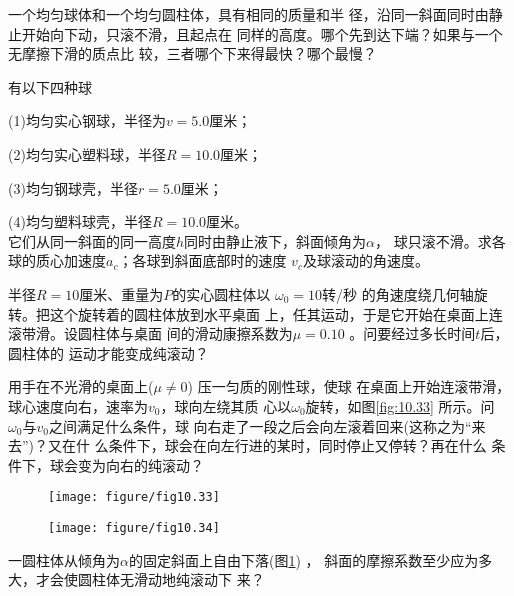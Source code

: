 \documentclass[../outline-of-mechanics.tex]{subfiles}
\begin{document}
\begin{exercises}
\exercise 一个均匀球体和一个均匀圆柱体，具有相同的质量和半
径，沿同一斜面同时由静止开始向下动，只滚不滑，且起点在
同样的高度。哪个先到达下端？如果与一个无摩擦下滑的质点比
较，三者哪个下来得最快？哪个最慢？

\exercise 有以下四种球

(1)均匀实心钢球，半径为$ v = 5 . 0 $厘米；

(2)均匀实心塑料球，半径$ R = 1 0 . 0 $厘米；

(3)均匀钢球壳，半径$ r = 5 . 0 $厘米；

(4)均匀塑料球壳，半径$ R = 1 0 . 0 $厘米。\\
它们从同一斜面的同一高度$ h $同时由静止液下，斜面倾角为$ \alpha $，
球只滚不滑。求各球的质心加速度$ a _ { c } $；各球到斜面底部时的速度
$ v _ { c } $及球滚动的角速度。

\exercise 半径$ R = 1 0 $厘米、重量为$ P $的实心圆柱体以 $ \omega _ { 0 } = 1 0 $转/秒
的角速度绕几何轴旋转。把这个旋转着的圆柱体放到水平桌面
上，任其运动，于是它开始在桌面上连滚带滑。设圆柱体与桌面
间的滑动康擦系数为$ \mu = 0 . 1 0 $ 。问要经过多长时间$ t $后，圆柱体的
运动才能变成纯滚动？

\exercise 用手在不光滑的桌面上($ \mu \ne 0 $) 压一匀质的刚性球，使球
在桌面上开始连滚带滑，球心速度向右，速率为$ v _ { 0 } $，球向左绕其质
心以$ \omega _ { 0 } $旋转，如图\ref{fig:10.33} 所示。问 $ \omega _ { 0 } $与$ v _ { 0 } $之间满足什么条件，球
向右走了一段之后会向左滚着回来(这称之为“来去”)？又在什
么条件下，球会在向左行进的某时，同时停止又停转？再在什么
条件下，球会变为向右的纯滚动？

\begin{figure}[h]
  \begin{minipage}{0.4\linewidth}
    \centering
    \texttt{[image: figure/fig10.33]}
    \caption{}
    \label{fig:10.33}
  \end{minipage}
  \begin{minipage}{0.6\linewidth}
    \centering
    \texttt{[image: figure/fig10.34]}
    \caption{}
    \label{fig:10.34}
  \end{minipage}
\end{figure}

\exercise 一圆柱体从倾角为$ \alpha $的固定斜面上自由下落(图\ref{fig:10.34}) ，
斜面的摩擦系数至少应为多大，才会使圆柱体无滑动地纯滚动下
来？

\end{exercises}
\end{document}
